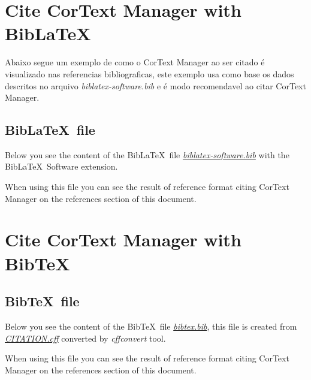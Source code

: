 \documentclass{article}
\begin{document}
\section{Cite CorText Manager with Bib\LaTeX} \label{example-biblatex}

Abaixo segue um exemplo de como o CorText Manager ao ser citado\cite{cortext_manager_v2} é visualizado nas referencias
bibliograficas, este exemplo usa como base os
dados descritos no arquivo {\em biblatex-software.bib} e é modo recomendavel ao citar CorText Manager.

\printbibliography[type=software,title={\small References (example)}]

\subsection{Bib\LaTeX \ file}

Below you see the content of the Bib\LaTeX \ file
\href{https://github.com/cortext/how-to-cite-cortext/blob/main/biblatex-software.bib}{\em biblatex-software.bib}
with the Bib\LaTeX \ Software extension\cite{softwareheritageorg_citing_2020}.


When using this file you can see the result of reference format citing CorText
Manager \cite{cortext_manager_v2} on the references section of this document.

\section{Cite CorText Manager with Bib\TeX} \label{example-bibtex}

\printbibliography[type=misc,keyword=cortext,title={\small References (example)}]

\subsection{Bib\TeX \ file}

Below you see the content of the Bib\TeX \ file
\href{https://github.com/cortext/how-to-cite-cortext/blob/main/bibtex.bib}{\em bibtex.bib},
this file is created from
\href{https://github.com/cortext/how-to-cite-cortext/blob/main/CITATION.cff}{\em CITATION.cff}
converted by {\em cffconvert} tool.


When using this file you can see the result of reference format citing CorText
Manager \cite{cortext_manager_v2_bibtex} on the references section of this document.
\end{document}
